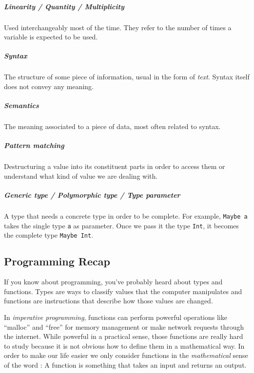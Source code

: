 \documentclass[
]{article}
\begin{document}
\hypertarget{linearity-quantity-multiplicity}{%
\subparagraph{Linearity / Quantity /
Multiplicity}\label{linearity-quantity-multiplicity}}

Used interchangeably most of the time. They refer to the number of times
a variable is expected to be used.

\hypertarget{syntax}{%
\subparagraph{Syntax}\label{syntax}}

The structure of some piece of information, usual in the form of
\emph{text}. Syntax itself does not convey any meaning.

\hypertarget{semantics}{%
\subparagraph{Semantics}\label{semantics}}

The meaning associated to a piece of data, most often related to syntax.

\hypertarget{pattern-matching}{%
\subparagraph{Pattern matching}\label{pattern-matching}}

Destructuring a value into its constituent parts in order to access them
or understand what kind of value we are dealing with.

\hypertarget{generic-type-polymorphic-type-type-parameter}{%
\subparagraph{Generic type / Polymorphic type / Type
parameter}\label{generic-type-polymorphic-type-type-parameter}}

A type that needs a concrete type in order to be complete. For example,
\texttt{Maybe\ a} takes the single type \texttt{a} as parameter. Once we
pass it the type \texttt{Int}, it becomes the complete type
\texttt{Maybe\ Int}.

\hypertarget{programming-recap}{%
\subsection{Programming Recap}\label{programming-recap}}

If you know about programming, you've probably heard about types and
functions. Types are ways to classify values that the computer
manipulates and functions are instructions that describe how those
values are changed.

In \emph{imperative programming}, functions can perform powerful
operations like ``malloc'' and ``free'' for memory management or make
network requests through the internet. While powerful in a practical
sense, those functions are really hard to study because it is not
obvious how to define them in a mathematical way. In order to make our
life easier we only consider functions in the \emph{mathematical} sense
of the word : A function is something that takes an input and returns an
output.
\end{document}

